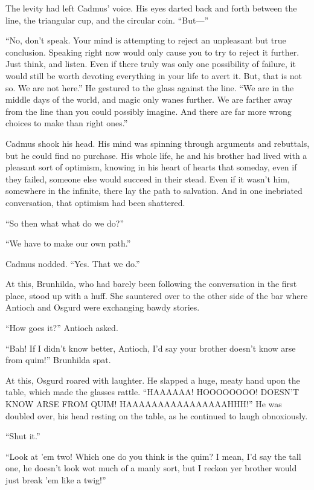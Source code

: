 The levity had left Cadmus’ voice. His eyes darted back and forth between the line, the triangular cup, and the circular coin. “But\mbox{---}”

“No, don’t speak. Your mind is attempting to reject an unpleasant but true conclusion. Speaking right now would only cause you to try to reject it further. Just think, and listen. Even if there truly was only one possibility of failure, it would still be worth devoting everything in your life to avert it. But, that is not so. We are not here.” He gestured to the glass against the line. “We are in the middle days of the world, and magic only wanes further. We are farther away from the line than you could possibly imagine. And there are far more wrong choices to make than right ones.”

Cadmus shook his head. His mind was spinning through arguments and rebuttals, but he could find no purchase. His whole life, he and his brother had lived with a pleasant sort of optimism, knowing in his heart of hearts that someday, even if they failed, someone else would succeed in their stead. Even if it wasn’t him, somewhere in the infinite, there lay the path to salvation. And in one inebriated conversation, that optimism had been shattered.

“So then what{\el} what do we do?”

“We have to make our own path.”

Cadmus nodded. “Yes. That we do.”

At this, Brunhilda, who had barely been following the conversation in the first place, stood up with a huff. She sauntered over to the other side of the bar where Antioch and Osgurd were exchanging bawdy stories.

“How goes it?” Antioch asked.

“Bah! If I didn’t know better, Antioch, I’d say your brother doesn’t know arse from quim!” Brunhilda spat.

At this, Osgurd roared with laughter. He slapped a huge, meaty hand upon the table, which made the glasses rattle. “HAAAAAA! HOOOOOOOO! DOESN’T KNOW ARSE FROM QUIM! HAAAAAAAAAAAAAAAAHHH!” He was doubled over, his head resting on the table, as he continued to laugh obnoxiously.

“Shut it.”

“Look at ’em two! Which one do you think is the quim? I mean, I’d say the tall one, he doesn’t look wot much of a manly sort, but I reckon yer brother would just break ’em like a twig!”

